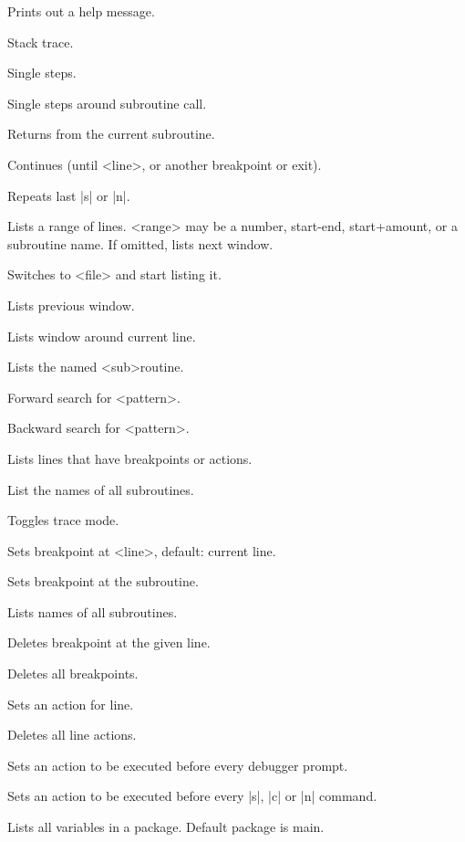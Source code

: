 \begin{enum}{2.5cm}

Prints out a help message.

Stack trace.

Single steps.

Single steps around subroutine call.

Returns from the current subroutine.

Continues (until <line>, or another breakpoint or exit).

Repeats last |s| or |n|.

Lists a range of lines. <range> may be a number, start-end,
start+amount, or a subroutine name. If omitted, lists next window. 

Switches to <file> and start listing it.

\Xi{|-|}
Lists previous window.

Lists window around current line.

Lists the named <sub>routine.

Forward search for <pattern>.

Backward search for <pattern>.

Lists lines that have breakpoints or actions.

List the names of all subroutines.

Toggles trace mode.

Sets breakpoint at <line>, default: current line.

Sets breakpoint at the subroutine.

Lists names of all subroutines.

Deletes breakpoint at the given line.

Deletes all breakpoints.

Sets an action for line.

Deletes all line actions.

Sets an action to be executed before every debugger prompt.

Sets an action to be executed before every |s|, |c| or |n| command.

Lists all variables in a package. Default package is main.


\end{enum}
